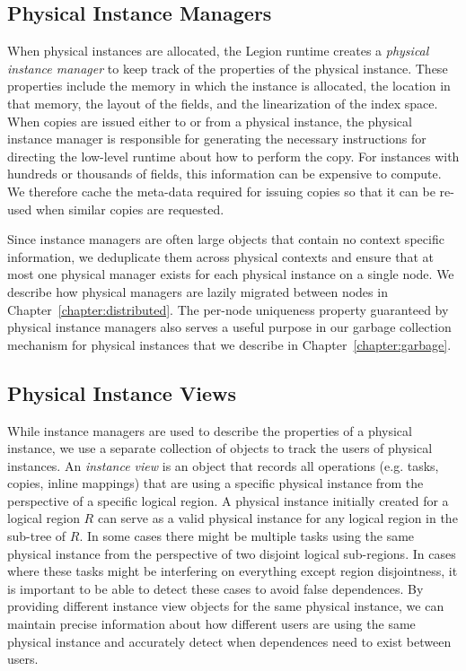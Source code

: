 \subsection{Physical Instance Managers}
\label{subsec:instmanagers}
When physical instances are allocated, the
Legion runtime creates a {\em physical instance 
manager} to keep track of the properties of the 
physical instance. These properties include the 
memory in which the instance is allocated, the location 
in that memory, the layout of the fields, and the 
linearization of the index space.
When copies are issued either to or
from a physical instance, the physical instance
manager is responsible for generating the necessary
instructions for directing the low-level runtime
about how to perform the copy. For instances with
hundreds or thousands of fields, this information
can be expensive to compute.  We therefore cache
the meta-data required for issuing copies so that
it can be re-used when similar copies are requested.

Since instance managers are often large objects that
contain no context specific information, we deduplicate
them across physical contexts and ensure that at
most one physical manager exists for each physical
instance on a single node. We describe how physical
managers are lazily migrated between nodes in 
Chapter~\ref{chapter:distributed}.  The per-node 
uniqueness property guaranteed by physical instance
managers also serves a useful purpose in our 
garbage collection mechanism for physical instances 
that we describe in Chapter~\ref{chapter:garbage}.

\subsection{Physical Instance Views}
\label{subsec:instviews}
While instance managers are used to describe the
properties of a physical instance, we use a 
separate collection of objects to track the 
users of physical instances. An {\em instance view}
is an object that records all operations (e.g.
tasks, copies, inline mappings) that are 
using a specific physical instance from the
perspective of a specific logical region. A
physical instance initially created for a logical
region $R$ can serve as a valid physical instance
for any logical region in the sub-tree of $R$.
In some cases there might be multiple tasks using
the same physical instance from the perspective of
two disjoint logical sub-regions. In cases where
these tasks might be interfering on everything except
region disjointness, it is important to be
able to detect these cases to avoid false dependences.
By providing different instance view objects for
the same physical instance, we can maintain precise
information about how different users are using the
same physical instance and accurately detect when
dependences need to exist between users.

